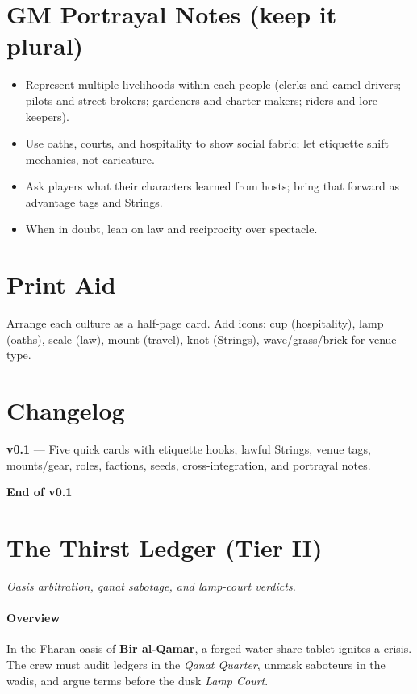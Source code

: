 \documentclass[11pt]{article}
\begin{document}
\section{GM Portrayal Notes (keep it plural)}
\begin{itemize}
\item Represent multiple livelihoods within each people (clerks and camel-drivers; pilots and street brokers; gardeners and charter-makers; riders and lore-keepers).
\item Use oaths, courts, and hospitality to show social fabric; let etiquette shift mechanics, not caricature.
\item Ask players what their characters learned from hosts; bring that forward as advantage tags and Strings.
\item When in doubt, lean on law and reciprocity over spectacle.
\end{itemize}

\section*{Print Aid}

Arrange each culture as a half-page card. Add icons: cup (hospitality), lamp (oaths), scale (law), mount (travel), knot (Strings), wave/grass/brick for venue type.

\section*{Changelog}

\textbf{v0.1} --- Five quick cards with etiquette hooks, lawful Strings, venue tags, mounts/gear, roles, factions, seeds, cross-integration, and portrayal notes.

\textbf{End of v0.1}

\section*{The Thirst Ledger (Tier II)}
\textit{Oasis arbitration, qanat sabotage, and lamp-court verdicts.}

\paragraph{Overview} In the Fharan oasis of \textbf{Bir al-Qamar}, a forged water-share tablet ignites a crisis. The crew must audit ledgers in the \emph{Qanat Quarter}, unmask saboteurs in the wadis, and argue terms before the dusk \emph{Lamp Court}.
\end{document}
